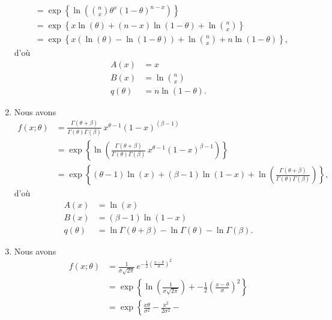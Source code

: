 \begin{exercice}
\begin{sol}
\begin{enumerate}
\begin{align*}
        &= \exp
        \left\{
          \ln \left( \binom{n}{x} \theta^x (1 - \theta)^{n - x} \right)
        \right\} \\
        &= \exp
        \left\{
          x \ln(\theta) + (n - x) \ln(1 - \theta) + \ln \binom{n}{x}
        \right\} \\
        &= \exp
        \left\{
          x(\ln(\theta) - \ln(1 - \theta)) + \ln \binom{n}{x} +
          n \ln(1 - \theta)
        \right\},
      \end{align*}
      d'où
      \begin{align*}
        A(x) &= x \\
        B(x) &= \ln \binom{n}{x} \\
        q(\theta) &= n \ln(1 - \theta).
      \end{align*}
    \item Nous avons
      \begin{align*}
        f(x; \theta)
        &= \frac{\Gamma(\theta + \beta)}{\Gamma(\theta) \Gamma(\beta)}\,
        x^{\theta-1} (1 - x)^{(\beta - 1)} \\
        &= \exp
        \left\{
          \ln \left(
            \frac{\Gamma(\theta+\beta)}{\Gamma(\theta)\Gamma(\beta)}\,
            x^{\theta-1} (1 - x)^{\beta - 1}
            \right)
          \right\} \\
        &= \exp
        \left\{
          (\theta - 1) \ln(x) + (\beta - 1) \ln(1 - x) +
          \ln \left(
            \frac{\Gamma(\theta+\beta)}{\Gamma(\theta)\Gamma(\beta)}
          \right)
        \right\},
      \end{align*}
      d'où
      \begin{align*}
        A(x) &= \ln (x) \\
        B(x) &= (\beta - 1) \ln(1 - x) \\
        q(\theta) &= \ln \Gamma(\theta + \beta) - \ln \Gamma(\theta) -
        \ln \Gamma(\beta).
      \end{align*}
    \item Nous avons
      \begin{align*}
        f(x; \theta)
        &= \frac{1}{\sigma \sqrt{2 \pi}}\,
        e^{-\frac{1}{2}\left(\frac{x-\theta}{\sigma}\right)^2} \\
        &= \exp
        \left\{
          \ln \left( \frac{1}{\sigma \sqrt{2 \pi}} \right) +
          -\frac{1}{2} \left(\frac{x-\theta}{\sigma}\right)^2
        \right\} \\
        &= \exp
        \left\{
          \frac{x\theta}{\sigma^2} - \frac{x^2}{2\sigma^2} -

\end{align*}
\end{enumerate}
\end{sol}
\end{exercice}

